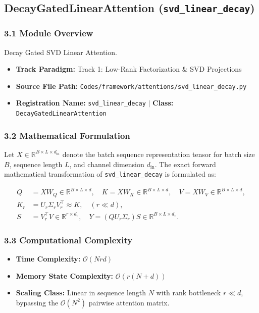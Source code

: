 \subsection{DecayGatedLinearAttention (\texttt{svd\_linear\_decay})}
\label{sec:app_module_svd\_linear\_decay}

\subsubsection*{3.1 Module Overview}
Decay Gated SVD Linear Attention.
\begin{itemize}
    \item \textbf{Track Paradigm:} Track 1: Low-Rank Factorization & SVD Projections
    \item \textbf{Source File Path:} \texttt{Codes/framework/attentions/svd\_linear\_decay.py}
    \item \textbf{Registration Name:} \texttt{svd\_linear\_decay} $\mid$ \textbf{Class:} \texttt{DecayGatedLinearAttention}
\end{itemize}

\subsubsection*{3.2 Mathematical Formulation}
Let $X \in \mathbb{R}^{B \times L \times d_{\text{in}}}$ denote the batch sequence representation tensor for batch size $B$, sequence length $L$, and channel dimension $d_{\text{in}}$. The exact forward mathematical transformation of \texttt{svd\_linear\_decay} is formulated as:

\begin{align}
Q &= X W_Q \in \mathbb{R}^{B \times L \times d}, \quad K = X W_K \in \mathbb{R}^{B \times L \times d}, \quad V = X W_V \in \mathbb{R}^{B \times L \times d}, \\
K_r &= U_r \Sigma_r V_r^\top \approx K, \quad (r \ll d), \\
S &= V_r^\top V \in \mathbb{R}^{r \times d_v}, \quad Y = (Q U_r \Sigma_r) S \in \mathbb{R}^{B \times L \times d_v}.
\end{align}


\subsubsection*{3.3 Computational Complexity}
\begin{itemize}
    \item \textbf{Time Complexity:} $\mathcal{O}(N r d)$
    \item \textbf{Memory State Complexity:} $\mathcal{O}(r(N + d))$
    \item \textbf{Scaling Class:} Linear in sequence length $N$ with rank bottleneck $r \ll d$, bypassing the $\mathcal{O}(N^2)$ pairwise attention matrix.
\end{itemize}

